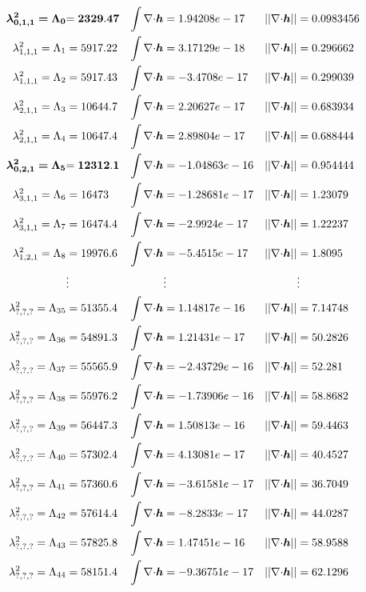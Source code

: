 \begin{align*}
\bm{\lambda^2_{0,1,1}=\Lambda_0} &\bf{= 2329.47}	&\int{\nabla\cdot}\bm{h} &= 1.94208e-17	&||{\nabla\cdot}\bm{h}|| &= 0.0983456\\
\lambda^2_{1,1,1}=\Lambda_1 &= 5917.22	&\int{\nabla\cdot}\bm{h} &= 3.17129e-18	&||{\nabla\cdot}\bm{h}|| &= 0.296662\\
\lambda^2_{1,1,1}=\Lambda_2 &= 5917.43	&\int{\nabla\cdot}\bm{h} &= -3.4708e-17	&||{\nabla\cdot}\bm{h}|| &= 0.299039\\
\lambda^2_{2,1,1}=\Lambda_3 &= 10644.7	&\int{\nabla\cdot}\bm{h} &= 2.20627e-17	&||{\nabla\cdot}\bm{h}|| &= 0.683934\\
\lambda^2_{2,1,1}=\Lambda_4 &= 10647.4	&\int{\nabla\cdot}\bm{h} &= 2.89804e-17	&||{\nabla\cdot}\bm{h}|| &= 0.688444\\
\bm{\lambda^2_{0,2,1}=\Lambda_5} &\bf{= 12312.1}	&\int{\nabla\cdot}\bm{h} &= -1.04863e-16	&||{\nabla\cdot}\bm{h}|| &= 0.954444\\
\lambda^2_{3,1,1}=\Lambda_6 &= 16473	&\int{\nabla\cdot}\bm{h} &= -1.28681e-17	&||{\nabla\cdot}\bm{h}|| &= 1.23079\\
\lambda^2_{3,1,1}=\Lambda_7 &= 16474.4	&\int{\nabla\cdot}\bm{h} &= -2.9924e-17	&||{\nabla\cdot}\bm{h}|| &= 1.22237\\
\lambda^2_{1,2,1}=\Lambda_8 &= 19976.6	&\int{\nabla\cdot}\bm{h} &= -5.4515e-17	&||{\nabla\cdot}\bm{h}|| &= 1.8095\\
&\vdots & &\vdots & &\vdots\\
\lambda^2_{?,?,?}=\Lambda_{35} &= 51355.4	&\int{\nabla\cdot}\bm{h} &= 1.14817e-16	&||{\nabla\cdot}\bm{h}|| &= 7.14748\\
\lambda^2_{?,?,?}=\Lambda_{36} &= 54891.3	&\int{\nabla\cdot}\bm{h} &= 1.21431e-17	&||{\nabla\cdot}\bm{h}|| &= 50.2826\\
\lambda^2_{?,?,?}=\Lambda_{37} &= 55565.9	&\int{\nabla\cdot}\bm{h} &= -2.43729e-16	&||{\nabla\cdot}\bm{h}|| &= 52.281\\
\lambda^2_{?,?,?}=\Lambda_{38} &= 55976.2	&\int{\nabla\cdot}\bm{h} &= -1.73906e-16	&||{\nabla\cdot}\bm{h}|| &= 58.8682\\
\lambda^2_{?,?,?}=\Lambda_{39} &= 56447.3	&\int{\nabla\cdot}\bm{h} &= 1.50813e-16	&||{\nabla\cdot}\bm{h}|| &= 59.4463\\
\lambda^2_{?,?,?}=\Lambda_{40} &= 57302.4	&\int{\nabla\cdot}\bm{h} &= 4.13081e-17	&||{\nabla\cdot}\bm{h}|| &= 40.4527\\
\lambda^2_{?,?,?}=\Lambda_{41} &= 57360.6	&\int{\nabla\cdot}\bm{h} &= -3.61581e-17	&||{\nabla\cdot}\bm{h}|| &= 36.7049\\
\lambda^2_{?,?,?}=\Lambda_{42} &= 57614.4	&\int{\nabla\cdot}\bm{h} &= -8.2833e-17	&||{\nabla\cdot}\bm{h}|| &= 44.0287\\
\lambda^2_{?,?,?}=\Lambda_{43} &= 57825.8	&\int{\nabla\cdot}\bm{h} &= 1.47451e-16	&||{\nabla\cdot}\bm{h}|| &= 58.9588\\
\lambda^2_{?,?,?}=\Lambda_{44} &= 58151.4	&\int{\nabla\cdot}\bm{h} &= -9.36751e-17	&||{\nabla\cdot}\bm{h}|| &= 62.1296
\end{align*}

